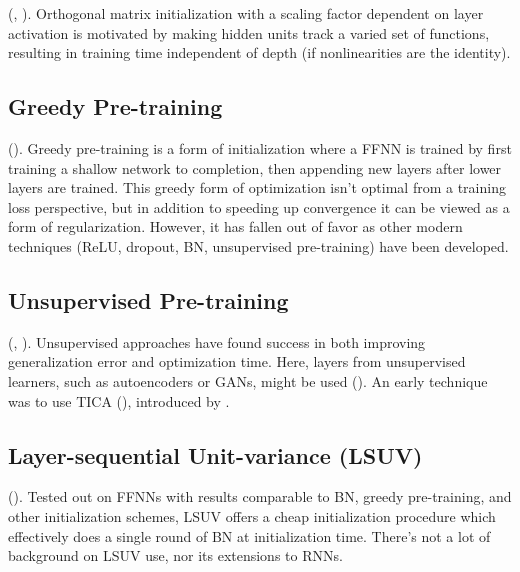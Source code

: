 \documentclass{article}
\begin{document}
(, ). Orthogonal matrix initialization with a scaling factor dependent on layer activation is motivated by making hidden units track a varied set of functions, resulting in training time independent of depth (if nonlinearities are the identity).

\subsection{Greedy Pre-training}

(). Greedy pre-training is a form of initialization where a FFNN is trained by first training a shallow network to completion, then appending new layers after lower layers are trained. This greedy form of optimization isn't optimal from a training loss perspective, but in addition to speeding up convergence it can be viewed as a form of regularization. However, it has fallen out of favor as other modern techniques (ReLU, dropout, BN, unsupervised pre-training) have been developed.

\subsection{Unsupervised Pre-training}

(, ). Unsupervised approaches have found success in both improving generalization error and optimization time. Here, layers from unsupervised learners, such as autoencoders or GANs, might be used (). An early technique was to use TICA (), introduced by .

\subsection{Layer-sequential Unit-variance (LSUV)}

(). Tested out on FFNNs with results comparable to BN, greedy pre-training, and other initialization schemes, LSUV offers a cheap initialization procedure which effectively does a single round of BN at initialization time. There's not a lot of background on LSUV use, nor its extensions to RNNs.
\end{document}
